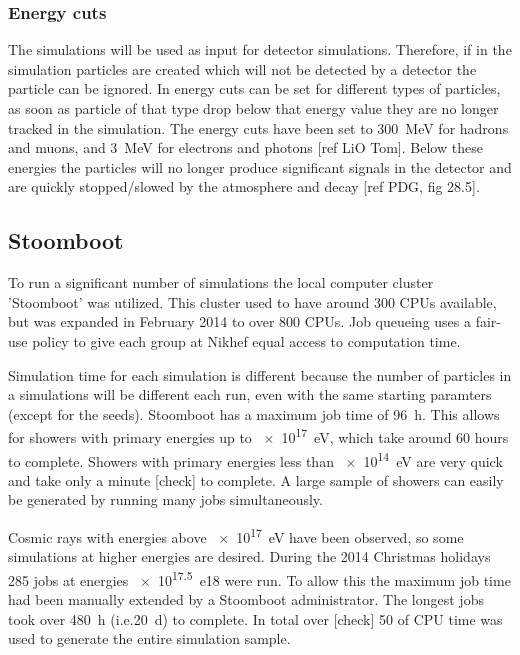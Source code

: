 \subsubsection{Energy cuts}

The \corsika simulations will be used as input for detector simulations. Therefore, if in the simulation particles are created which will not be detected by a \hisparc detector the particle can be ignored. In \corsika energy cuts can be set for different types of particles, as soon as particle of that type drop below that energy value they are no longer tracked in the simulation. The energy cuts have been set to \SI{300}{\MeV} for hadrons and muons, and \SI{3}{\MeV} for electrons and photons [ref LiO Tom]. Below these energies the particles will no longer produce significant signals in the detector and are quickly stopped/slowed by the atmosphere and decay [ref PDG, fig 28.5].


\subsection{Stoomboot}

To run a significant number of simulations the local \nikhef computer cluster 'Stoomboot' was utilized. This cluster used to have around 300 CPUs available, but was expanded in February 2014 to over 800 CPUs. Job queueing uses a fair-use policy to give each group at Nikhef equal access to computation time.

Simulation time for each simulation is different because the number of particles in a simulations will be different each run, even with the same starting paramters (except for the seeds). Stoomboot has a maximum job time of \SI{96}{\hour}. This allows for showers with primary energies up to \SI{e17}{\eV}, which take around 60 hours to complete. Showers with primary energies less than \SI{e14}{\eV} are very quick and take only a minute [check] to complete. A large sample of showers can easily be generated by running many jobs simultaneously.

Cosmic rays with energies above \SI{e17}{\eV} have been observed, so some simulations at higher energies are desired. During the 2014 Christmas holidays 285 jobs at energies \SIlist{e17.5}{e18}{\eV} were run. To allow this the maximum job time had been manually extended by a Stoomboot administrator. The longest jobs took over \SI{480}{\hour} (i.e.\SI{20}{\day}) to complete. In total over [check] \SI{50}{\year} of CPU time was used to generate the entire simulation sample.

